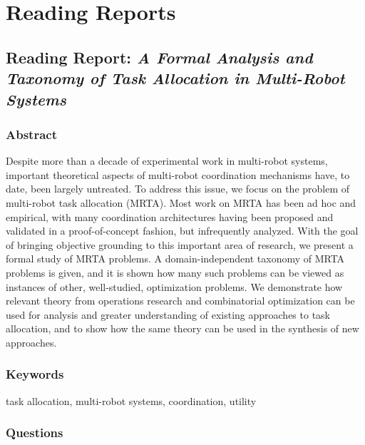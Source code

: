 

\chapter{Reading Reports}

\section{Reading Report: \emph{A Formal Analysis and Taxonomy of Task Allocation in Multi-Robot Systems}}
\cite{Gerkey2004}

\subsection*{Abstract}
Despite more than a decade of experimental work in multi-robot
systems, important theoretical aspects of multi-robot coordination
mechanisms have, to date, been largely untreated. To address this
issue, we focus on the problem of multi-robot task allocation (MRTA).
Most work on MRTA has been ad hoc and empirical, with many
coordination architectures having been proposed and validated in a
proof-of-concept fashion, but infrequently analyzed. With the goal of
bringing objective grounding to this important area of research, we
present a formal study of MRTA problems. A domain-independent
taxonomy of MRTA problems is given, and it is shown how many
such problems can be viewed as instances of other, well-studied,
optimization problems. We demonstrate how relevant theory from
operations research and combinatorial optimization can be used for
analysis and greater understanding of existing approaches to task
allocation, and to show how the same theory can be used in the
synthesis of new approaches.

\subsection*{Keywords}
task allocation, multi-robot systems, coordination, utility


\subsection*{Questions}
